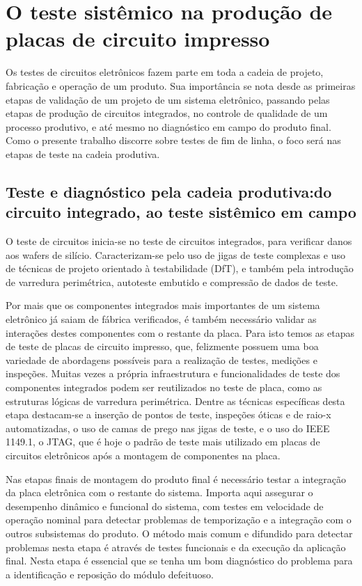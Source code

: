 \chapter{O teste sistêmico na produção de placas de circuito impresso}

Os testes de circuitos eletrônicos fazem parte em toda a cadeia de projeto, fabricação e operação de um produto. Sua importância se nota desde as primeiras etapas de validação de um projeto de um sistema eletrônico, passando pelas etapas de produção de circuitos integrados, no controle de qualidade de um processo produtivo, e até mesmo no diagnóstico em campo do produto final. Como o presente trabalho discorre sobre testes de fim de linha, o foco será nas etapas de teste na cadeia produtiva.

\section{Teste e diagnóstico pela cadeia produtiva:do circuito integrado, ao teste sistêmico em campo}
 
O teste de circuitos inicia-se no teste de circuitos integrados, para verificar danos aos wafers de silício. Caracterizam-se pelo uso de jigas de teste complexas e uso de técnicas de projeto orientado à testabilidade (DfT), e também pela introdução de varredura perimétrica, autoteste embutido e compressão de dados de teste.

Por mais que os componentes integrados mais importantes de um sistema eletrônico já saiam de fábrica verificados, é também necessário validar as interações destes componentes com o restante da placa. Para isto temos as etapas de teste de placas de circuito impresso, que, felizmente possuem uma boa variedade de abordagens possíveis para a realização de testes, medições e inspeções. Muitas vezes a própria infraestrutura e funcionalidades de teste dos componentes integrados podem ser reutilizados no teste de placa, como as estruturas lógicas de varredura perimétrica. Dentre as técnicas específicas desta etapa destacam-se a inserção de pontos de teste, inspeções óticas e de raio-x automatizadas, o uso de camas de prego nas jigas de teste, e o uso do IEEE 1149.1, o JTAG, que é hoje o padrão de teste mais utilizado em placas de circuitos eletrônicos após a montagem de componentes na placa.

Nas etapas finais de montagem do produto final é necessário testar a integração da placa eletrônica com o restante do sistema. Importa aqui assegurar o desempenho dinâmico e funcional do sistema, com testes em velocidade de operação nominal para detectar problemas de temporização e a integração com o outros subsistemas do produto. O método mais comum e difundido para detectar problemas nesta etapa é através de testes funcionais e da execução da aplicação final. Nesta etapa é essencial que se tenha um bom diagnóstico do problema para a identificação e reposição do módulo defeituoso.

